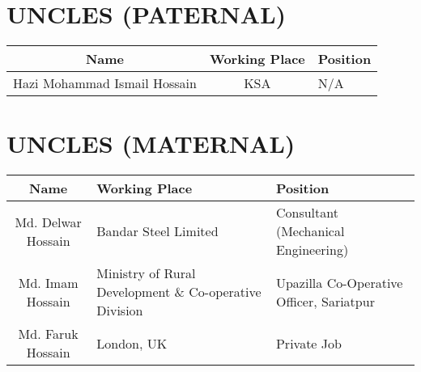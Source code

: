 \documentclass{article}
\begin{document}
\vspace{1cm} %

\section*{UNCLES (PATERNAL)}
\begin{tabular}{|c|c|>{\centering\arraybackslash}m{5.25cm}|}
    \hline
    \textbf{Name} & \textbf{Working Place} & \textbf{Position} \\
    \hline
    Hazi Mohammad Ismail Hossain & KSA & N/A \\
    \hline
\end{tabular}

\vspace{1cm} %

\section*{UNCLES (MATERNAL)}
\begin{tabular}{|c|>{\centering\arraybackslash}m{4.75cm}|>{\centering\arraybackslash}m{5cm}|}
    \hline
    \textbf{Name} & \textbf{Working Place} & \textbf{Position} \\
    \hline
    Md. Delwar Hossain & Bandar Steel Limited & Consultant (Mechanical Engineering) \\
    \hline
    Md. Imam Hossain & Ministry of Rural Development \& Co-operative Division & Upazilla Co-Operative Officer, Sariatpur \\
    \hline
    Md. Faruk Hossain & London, UK & Private Job \\
    \hline
\end{tabular}
\end{document}
